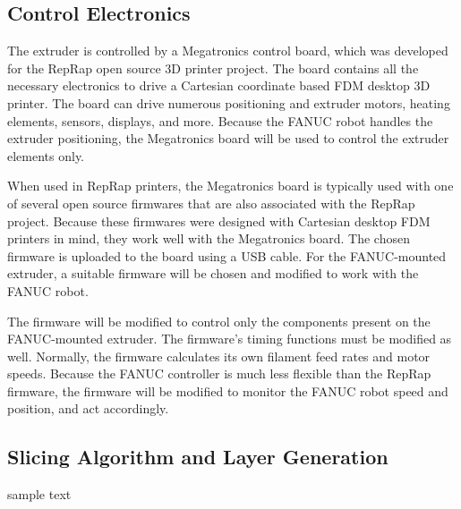 \subsection{Control Electronics}
\indent 

The extruder is controlled by a Megatronics control board, which was developed for the RepRap open source 3D printer project. The board contains all the necessary electronics to drive a Cartesian coordinate based FDM desktop 3D printer. The board can drive numerous positioning and extruder motors, heating elements, sensors, displays, and more. Because the FANUC robot handles the extruder positioning, the Megatronics board will be used to control the extruder elements only. 

When used in RepRap printers, the Megatronics board is typically used with one of several open source firmwares that are also associated with the RepRap project. Because these firmwares were designed with Cartesian desktop FDM printers in mind, they work well with the Megatronics board. The chosen firmware is uploaded to the board using a USB cable. For the FANUC-mounted extruder, a suitable firmware will be chosen and modified to work with the FANUC robot.

The firmware will be modified to control only the components present on the FANUC-mounted extruder. The firmware's timing functions must be modified as well. Normally, the firmware calculates its own filament feed rates and motor speeds. Because the FANUC controller is much less flexible than the RepRap firmware, the firmware will be modified to monitor the FANUC robot speed and position, and act accordingly. 

\subsection{Slicing Algorithm and Layer Generation}

\indent



sample text
